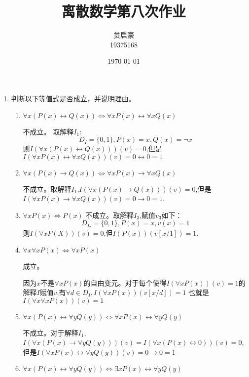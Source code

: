 \documentclass[UTF8]{ctexart}
\title{离散数学第八次作业}
\author{贠启豪\\19375168}
\date{\today}
\begin{document}
    \maketitle
    \begin{enumerate}
        \item 判断以下等值式是否成立，并说明理由。
        \begin{enumerate}
            \item $\forall x(P(x) \leftrightarrow  Q(x)) \Leftrightarrow  \forall xP(x) \leftrightarrow  \forall xQ(x)$
            
            不成立。
            取解释$I_1$:
            \[
                D_I=\{0,1\},P(x)=x,Q(x)=\neg x
            \]
            则$I(\forall x(P(x)\leftrightarrow Q(x)))(v)=0$,但是$I(\forall xP(x)\leftrightarrow \forall xQ(x))(v)=0\leftrightarrow 0=1$

            \item $\forall x(P(x) \rightarrow  Q(x)) \Leftrightarrow  \forall xP(x) \rightarrow  \forall xQ(x)$
            
            不成立。取解释$I_1$,$I(\forall x(P(x)\rightarrow Q(x)))(v)=0$,但是$I(\forall xP(x)\rightarrow \forall xQ(x))(v)=0\rightarrow 0=1$.

            
            \item $\forall xP(x) \Leftrightarrow  P(x)$
            不成立。取解释$I_3$,赋值$v_3$如下：
            \[
                D_{I_2}=\{0,1\},P(x)=x,v(x)=1
            \]
            则$I(\forall xP(X))(v)=0$,但$I(P(x))(v[x/1])=1$.
            \item $\forall x\forall xP(x) \Leftrightarrow  \forall xP(x)$
            
            成立。

            因为$x$不是$\forall xP(x)$的自由变元。对于每个使得$I(\forall xP(x))(v)=1$的解释$I$赋值$v$,有$\forall d\in D_I,I(\forall xP(x))(v[x/d])=1$
            也就是$I(\forall x\forall xP(x))(v)=1$
            
            \item $\forall x(P(x) \leftrightarrow  \forall yQ(y)) \Leftrightarrow  \forall xP(x) \leftrightarrow  \forall yQ(y)$
            
            不成立。对于解释$I_1$,$I(\forall x(P(x)\rightarrow \forall yQ(y)))(v)=I(\forall x(P(x)\leftrightarrow 0))(v)=0$,但是$I(\forall xP(x)\leftrightarrow \forall yQ(y))(v)=0\rightarrow 0=1$
            
            \item $\forall x(P(x) \leftrightarrow  \forall yQ(y)) \Leftrightarrow  \exists xP(x) \leftrightarrow  \forall yQ(y)$
            

\end{enumerate}
\end{enumerate}
\end{document}
